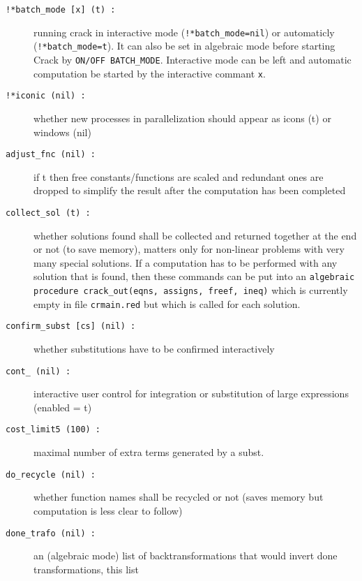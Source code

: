 \documentclass[12pt]{article}
\begin{document}
\begin{description}    
\item[{\tt !*batch\_mode [x] (t) :}] running crack in interactive mode
                   ({\tt !*batch\_mode=nil}) or automaticly 
                   ({\tt !*batch\_mode=t}). It can also be 
                   set in algebraic mode before starting {\sc Crack}
                   by {\tt ON/OFF BATCH\_MODE}. Interactive mode can be left 
                   and automatic computation be started by the interactive 
                   commant {\tt x}.
\item[{\tt !*iconic (nil) :}] whether new processes in parallelization
                   should appear as icons (t) or windows (nil)
\item[{\tt adjust\_fnc (nil) :}] if t then free constants/functions
                    are scaled and redundant ones are dropped to
                    simplify the result after the computation has been
                    completed
\item[{\tt collect\_sol (t) :}] whether solutions found shall be collected and
                    returned together at the end or not (to save
                    memory), matters only for non-linear problems with
                    very many special solutions. If a computation has
                    to be performed with any solution that is found,
                    then these commands can be put into an 
                    {\tt algebraic procedure crack\_out(eqns, assigns, freef, ineq)}
                    which is currently empty in file {\tt crmain.red}
                    but which is called for each solution.
\item[{\tt confirm\_subst [cs] (nil) :}] whether substitutions have to be 
                   confirmed interactively
\item[{\tt cont\_ (nil) :}] interactive user control for integration
                   or substitution of large expressions (enabled = t)
\item[{\tt cost\_limit5 (100) :}] maximal number of extra terms
                    generated by a subst.
\item[{\tt do\_recycle (nil) :}] whether function names shall be recycled 
                   or not (saves memory but computation is less clear to follow)
\item[{\tt done\_trafo (nil) :}] an (algebraic mode) list of backtransformations 
                   that would invert done transformations, this list

\end{description}
\end{document}
